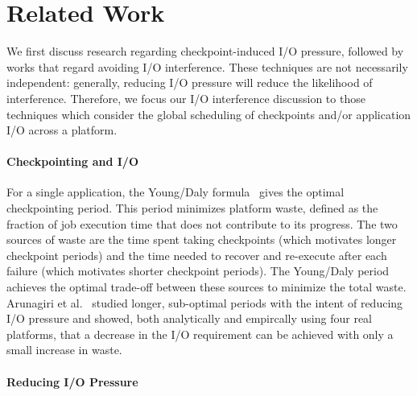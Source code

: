 \documentclass[two]{article}
\begin{document}
\section{Related Work}\label{sec:related}

We first discuss research regarding checkpoint-induced I/O pressure, followed by
works that regard avoiding I/O interference.  These techniques are not necessarily
independent: generally, reducing I/O pressure will reduce the likelihood of
interference.  Therefore, we focus our I/O interference discussion to those
techniques which consider the global scheduling of checkpoints and/or application I/O
across a platform.


\paragraph*{Checkpointing and I/O}

For a single application, the Young/Daly formula~\cite{young74,daly04} gives the
optimal checkpointing period. This period minimizes platform waste, defined as the
fraction of job execution time that does not contribute to its progress.  The two
sources of waste are the time spent taking checkpoints (which motivates longer
checkpoint periods) and the time needed to recover and re-execute after each failure
(which motivates shorter checkpoint periods). The Young/Daly period achieves the
optimal trade-off between these sources to minimize the total waste. Arunagiri et
al.~\cite{Arunagiri2010} studied longer, sub-optimal periods with the intent of
reducing I/O pressure and showed, both analytically and empircally using four real
platforms, that a decrease in the I/O requirement can be achieved with only a small
increase in waste.

\paragraph*{Reducing I/O Pressure}
\end{document}
